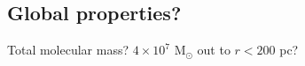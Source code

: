 \subsection{Global properties?}

Total molecular mass?  $4\times10^7$ M$_\odot$ out to $r<200$ pc?

